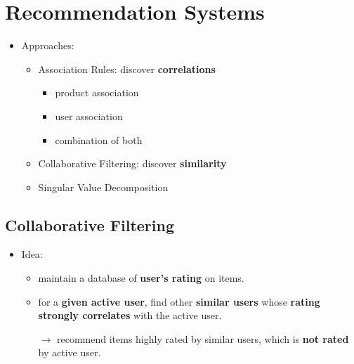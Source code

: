 \section{Recommendation Systems}
\begin{itemize}
	\item Approaches:
	\begin{itemize}
		\item Association Rules: discover \textbf{correlations}
		\begin{itemize}
			\item product association
			\item user association
			\item combination of both
		\end{itemize}
		\item Collaborative Filtering: discover \textbf{similarity}
		\item Singular Value Decomposition
	\end{itemize}
\end{itemize}

\subsection{Collaborative Filtering}
\begin{itemize}
	\item Idea: 
	\begin{itemize}
		\item maintain a database of \textbf{user's rating} on items.
		\item for a \textbf{given active user}, find other \textbf{similar users} whose \textbf{rating strongly correlates} with the active user.
		
		$\rightarrow$ recommend items highly rated by similar users, which is \textbf{not rated} by active user.
	\end{itemize}
	
\end{itemize}

